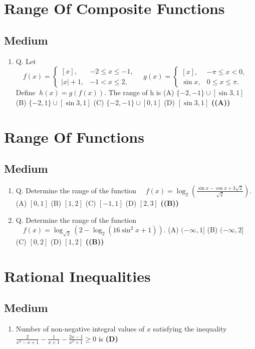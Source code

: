 \documentclass{article}
\begin{document}
\section{Range Of Composite Functions}
\subsection{Medium}
\begin{enumerate}
\item Q. Let
$\quad f(x) = \begin{cases} [x], & -2 \le x \le -1, \\ |x| + 1, & -1 < x \le 2, \end{cases} \quad g(x) = \begin{cases} [x], & -\pi \le x < 0, \\ \sin x, & 0 \le x \le \pi. \end{cases}$
Define $\ h(x) = g(f(x)).$ The range of h is
(A) $\{-2,-1\} \cup [\sin 3, 1]$
(B) $\{-2, 1\} \cup [\sin 3, 1]$
(C) $\{-2,-1\} \cup [0, 1]$
(D) $[\sin 3,1]$ \hfill \textbf{((A))}
\end{enumerate}
\section{Range Of Functions}
\subsection{Medium}
\begin{enumerate}
\item Q. Determine the range of the function
$\quad f(x) = \log_2(\frac{\sin x - \cos x + 3\sqrt{2}}{\sqrt{2}}).$
(A) $[0,1]$
(B) $[1,2]$
(C) $[-1,1]$
(D) $[2,3]$ \hfill \textbf{((B))}
\item Q. Determine the range of the function
$\quad f(x) = \log_{\sqrt{2}}(2 - \log_2(16 \sin^2x + 1)).$
(A) $(-\infty,1]$
(B) $(-\infty,2]$
(C) $[0,2]$
(D) $[1,2]$ \hfill \textbf{((B))}
\end{enumerate}
\section{Rational Inequalities}
\subsection{Medium}
\begin{enumerate}
\item Number of non-negative integral values of $x$ satisfying the inequality $\frac{2}{x^2 - x + 1} - \frac{1}{x+1} - \frac{2x-1}{x^3+1} \geq 0$ is \hfill \textbf{(D)}
\end{enumerate}
\end{document}
